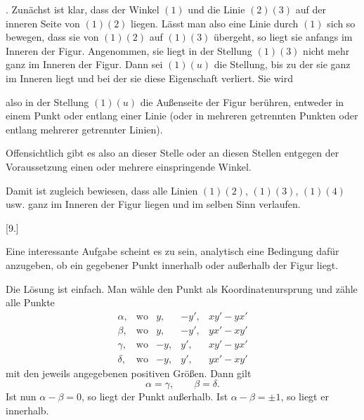 \par{}%
. Zunächst ist klar, dass der Winkel $(1)$ und die Linie $(2)(3)$ auf der inneren Seite von $(1)(2)$ liegen. Lässt man also eine Linie durch $(1)$ sich so bewegen, dass sie von $(1)(2)$ auf $(1)(3)$ übergeht, so liegt sie anfangs im Inneren der Figur. Angenommen, sie liegt in der Stellung $(1)(3)$ nicht mehr ganz im Inneren der Figur. Dann sei $(1)(u)$ die Stellung, bis zu der sie ganz im Inneren liegt und bei der sie diese Eigenschaft verliert. Sie wird

\begin{center}\hfill\end{center}
\noindent also in der Stellung $(1)(u)$ die Außenseite der Figur berühren, entweder in einem Punkt oder entlang einer Linie (oder in mehreren getrennten Punkten oder entlang mehrerer getrennter Linien).

Offensichtlich gibt es also an dieser Stelle oder an diesen Stellen entgegen der Voraussetzung einen oder mehrere einspringende Winkel.

Damit ist zugleich bewiesen, dass alle Linien $(1)(2)$, $(1)(3)$, $(1)(4)$ usw. ganz im Inneren der Figur liegen und im selben Sinn verlaufen.

\begin{center}
[9.]
\end{center}

Eine interessante Aufgabe scheint es zu sein, analytisch eine Bedingung dafür anzugeben, ob ein gegebener Punkt innerhalb oder außerhalb der Figur liegt.

Die Lösung ist einfach. Man wähle den Punkt als Koordinatenursprung und zähle alle Punkte
\[
\begin{array}{cllll}
\alpha, & \text{wo} & y, & -y', & xy'-yx' \\
\beta, & \text{wo} & y, & -y', & yx'-xy' \\
\gamma, & \text{wo} & -y, & y', & xy'-yx' \\
\delta, & \text{wo} & -y, & y', & yx'-xy'
\end{array}
\]
mit den jeweils angegebenen positiven Größen. Dann gilt
\[
\alpha = \gamma, \qquad \beta = \delta.
\]
Ist nun $\alpha - \beta = 0$, so liegt der Punkt außerhalb. Ist $\alpha - \beta = \pm 1$, so liegt er innerhalb.
